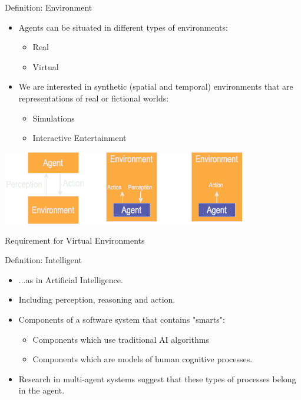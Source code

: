 \documentclass[aspectratio=1610,xcolor=dvipsnames,t]{beamer}
\begin{document}
\begin{frame}{Definition: Environment}
    \begin{itemize}
        \item Agents can be situated in different types
              of environments:
              \begin{itemize}
                    \item Real
                    \item Virtual
              \end{itemize}
        \item We are interested in synthetic (spatial and temporal)
              environments that are representations of real
              or fictional worlds:
                \begin{itemize}
                    \item Simulations
                    \item Interactive Entertainment
                \end{itemize}
    \end{itemize}
    \begin{center}
        \includegraphics[width=0.8\textwidth]{environments} 
    \end{center}
\end{frame} 

\begin{frame}{Requirement for Virtual Environments} 
\end{frame} 

\begin{frame}{Definition: Intelligent}
    \begin{itemize}
        \item ...as in Artificial Intelligence.
        \item Including perception, reasoning and action.
        \item Components of a software system that contains "smarts":
            \begin{itemize}
                \item Components which use traditional AI algorithms
                \item Components which are models of human cognitive 
                      processes.
            \end{itemize}
        \item Research in multi-agent systems suggest that these
              types of processes belong in the agent. 
    \end{itemize}
\end{frame} 
\end{document}
